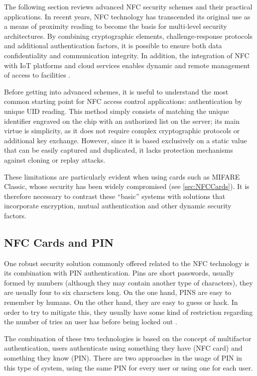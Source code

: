 The following section reviews advanced NFC security schemes and their practical applications. In recent years, NFC technology has transcended its original use as a means of proximity reading to become the basis for multi-level security architectures. By combining cryptographic elements, challenge-response protocols and additional authentication factors, it is possible to ensure both data confidentiality and communication integrity. In addition, the integration of NFC with IoT platforms and cloud services enables dynamic and remote management of access to facilities \cite{Ref69}.

Before getting into advanced schemes, it is useful to understand the most common starting point for NFC access control applications: authentication by unique UID reading. This method simply consists of matching the unique identifier engraved on the chip with an authorized list on the server; its main virtue is simplicity, as it does not require complex cryptographic protocols or additional key exchange. However, since it is based exclusively on a static value that can be easily captured and duplicated, it lacks protection mechanisms against cloning or replay attacks.

These limitations are particularly evident when using cards such as MIFARE Classic, whose security has been widely compromised \cite{ref70} (see \ref{sec:NFCCards}). It is therefore necessary to contrast these ``basic'' systems with solutions that incorporate encryption, mutual authentication and other dynamic security factors.

\subsection{NFC Cards and PIN}

One robust security solution commonly offered related to the NFC technology is its combination with PIN authentication. Pins are short passwords, usually formed by numbers (although they may contain another type of characters), they are usually four to six characters long. On the one hand, PINS are easy to remember by humans. On the other hand, they are easy to guess or hack. In order to try to mitigate this, they usually have some kind of restriction regarding the number of tries an user has before being locked out \cite{ref30}.

The combination of these two technologies is based on the concept of multifactor authentication, users authenticate using something they have (NFC card) and something they know (PIN). There are two approaches in the usage of PIN in this type of system, using the same PIN for every user or using one for each user.


